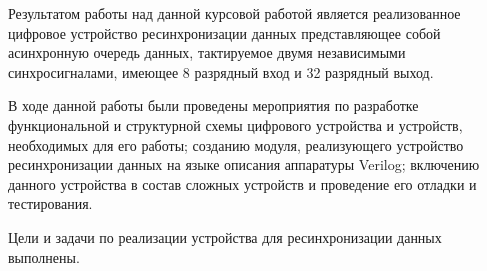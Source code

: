 \Conclusion %

Результатом работы над данной курсовой работой является реализованное цифровое устройство ресинхронизации данных представляющее собой асинхронную очередь данных, тактируемое двумя независимыми синхросигналами, имеющее 8 разрядный вход и 32 разрядный выход.

В ходе данной работы были проведены мероприятия по разработке функциональной и структурной схемы цифрового устройства и устройств, необходимых для его работы; созданию модуля, реализующего устройство ресинхронизации данных на языке описания аппаратуры Verilog; включению данного устройства в состав сложных устройств и проведение его отладки и тестирования.

Цели и задачи по реализации устройства для ресинхронизации данных выполнены. 

